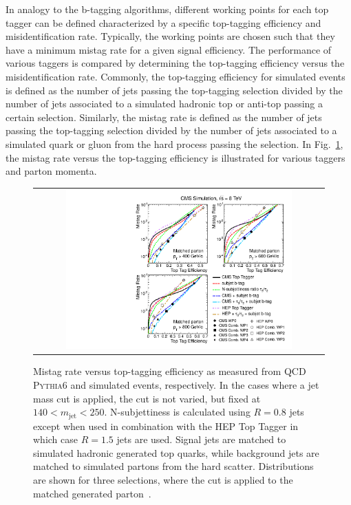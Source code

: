 In analogy to the b-tagging algorithms, different working points for each top tagger can be defined characterized by a specific top-tagging efficiency and misidentification rate. Typically, the working points are chosen such that they have a minimum mistag rate for a given signal efficiency. The performance of various taggers is compared by determining the top-tagging efficiency versus the misidentification rate. Commonly, the top-tagging efficiency for simulated events is defined as the number of jets passing the top-tagging selection divided by the number of jets associated to a simulated hadronic top or anti-top passing a certain \pt selection. Similarly, the mistag rate is defined as the number of jets passing the top-tagging selection divided by the number of jets associated to a simulated quark or gluon from the hard process passing the \pt selection. In Fig.~\ref{fig:boosted_top_roc}, the mistag rate versus the top-tagging efficiency is illustrated for various taggers and parton momenta.
\begin{figure}[!t] 
  \centering 
  \begin{tabular}{c}
    \includegraphics[width=0.8\textwidth]{figures/TopTag_ROC_Curves.pdf}  
  \end{tabular}
  \caption{Mistag rate versus top-tagging efficiency as measured from QCD \textsc{Pythia6} and \powheg \ttbar simulated events, respectively. In the cases where a jet mass cut is applied, the cut is not varied, but fixed at $140 < m_\mathrm{jet} < 250$\gev. N-subjettiness is calculated using $R = 0.8$ jets except when used in combination with the HEP Top Tagger in which case $R = 1.5$ jets are used. Signal jets are matched to simulated hadronic generated top quarks, while background jets are matched to simulated partons from the hard scatter. Distributions are shown for three \pt selections, where the \pt cut is applied to the matched generated parton~\cite{CMS-PAS-JME-13-007}.}
  \label{fig:boosted_top_roc}
\end{figure}
